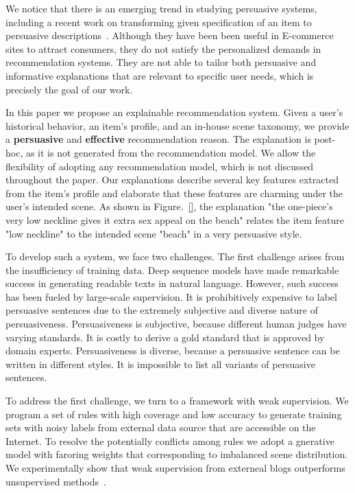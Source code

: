 \documentclass[sigconf]{acmart}
\begin{document}
We notice that there is an emerging trend in studying persuasive systems, including a recent work on transforming given specification of an item to persuasive descriptions~\cite{}. Although they have been been useful in E-commerce sites to attract consumers, they do not satisfy the personalized demands in recommendation systems. They are not able to tailor both persuasive and informative explanations that are relevant to specific user needs, which is precisely the goal of our work.

In this paper we propose an explainable recommendation system. Given a user's historical behavior, an item's profile, and an in-house scene taxonomy, we provide a  \textbf{persuasive} and \textbf{effective} recommendation reason. The explanation is post-hoc, as it is not generated from the recommendation model. We allow the flexibility of adopting any recommendation model, which is not discussed throughout the paper. Our explanations describe several key features extracted from the item's profile and elaborate that these features are charming under the user's intended scene. As shown in Figure.~\ref{}, the explanation "the one-piece's very low neckline gives it extra sex appeal on the beach" relates the item feature "low neckline" to the intended scene "beach" in a very persuasive style.  

To develop such a system, we face two challenges.  The first challenge arises from the insufficiency of training data. Deep sequence models have made remarkable success in generating readable texts in natural language. However, such success has been fueled by large-scale supervision. It is prohibitively expensive to label persuasive sentences due to the extremely subjective and diverse nature of persuasiveness. Persuasiveness is subjective, because different human judges have varying standards. It is costly to derive a gold standard that is approved by domain experts. Persuasiveness is diverse, because a persuasive sentence can be written in different styles.  It is impossible to list all variants of persuasive sentences.   
 
To address the first challenge, we turn to a framework with weak supervision. We program a set of rules with high coverage and low accuracy to generate training sets with noisy labels from external data source that are accessible on the Internet. To resolve the potentially conflicts among rules we adopt a gnerative model with faroring weights that corresponding to imbalanced scene distribution. We experimentally show that weak supervision from externeal blogs outperforms unsupervised methods~\cite{}. %
\end{document}
